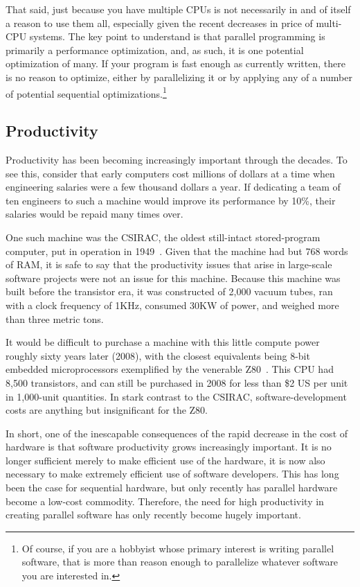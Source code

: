 That said, just because you have multiple CPUs is not necessarily
in and of itself a reason to use them all, especially given the
recent decreases in price of multi-CPU systems.
The key point to understand is that parallel programming is primarily
a performance optimization, and, as such, it is one potential optimization
of many.
If your program is fast enough as currently written, there is no
reason to optimize, either by parallelizing it or by applying any
of a number of potential sequential optimizations.\footnote{
	Of course, if you are a hobbyist whose primary interest is
	writing parallel software, that is more than reason enough to
	parallelize whatever software you are interested in.}

\subsection{Productivity}
\label{sec:intro:Productivity}

Productivity has been becoming increasingly important through the decades.
To see this, consider that early computers cost millions of dollars at
a time when engineering salaries were a few thousand dollars a year.
If dedicating a team of ten engineers to such a machine would improve
its performance by 10\%, their salaries would be repaid many times over.

One such machine was the CSIRAC, the oldest still-intact stored-program
computer, put in operation in
1949~\cite{CSIRACMuseumVictoria,CSIRACUniversityMelbourne}.
Given that the machine had but 768 words of RAM, it is safe to say
that the productivity issues that arise in large-scale software projects
were not an issue for this machine.
Because this machine was built before the transistor era, it was constructed
of 2,000 vacuum tubes, ran with a clock frequency of 1KHz,
consumed 30KW of power, and weighed more than three metric tons.

It would be difficult to purchase a machine with this little compute
power roughly sixty years later (2008), with the closest equivalents
being 8-bit embedded microprocessors exemplified by the venerable
Z80~\cite{z80Wikipedia}.
This CPU had 8,500 transistors, and can still be purchased in 2008
for less than \$2 US per unit in 1,000-unit quantities.
In stark contrast to the CSIRAC, software-development costs are
anything but insignificant for the Z80.

In short, one of the inescapable consequences of the rapid decrease in
the cost of hardware is that software productivity grows increasingly
important.
It is no longer sufficient merely to make efficient use of the hardware,
it is now also necessary to make extremely efficient use of software
developers.
This has long been the case for sequential hardware, but only recently
has parallel hardware become a low-cost commodity.
Therefore, the need for high productivity in creating parallel software
has only recently become hugely important.


